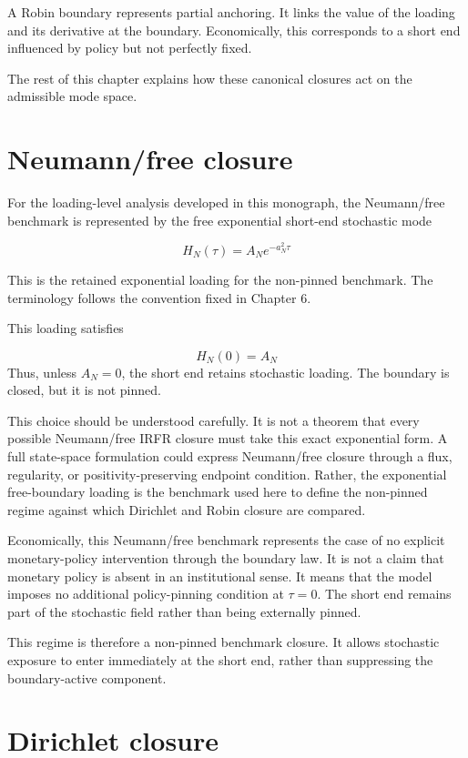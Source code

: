 \documentclass[11pt,oneside]{book}
\begin{document}
A Robin boundary represents partial anchoring. It links the value of the
loading and its derivative at the boundary. Economically, this
corresponds to a short end influenced by policy but not perfectly fixed.

The rest of this chapter explains how these canonical closures act on
the admissible mode space.

\section{Neumann/free closure}\label{naturalfree-closure}

For the loading-level analysis developed in this monograph, the Neumann/free
benchmark is represented by the free exponential short-end stochastic
mode

\[
H_N(\tau)=A_N e^{-a_N^2\tau}
\]

This is the retained exponential loading for the non-pinned benchmark. The terminology follows the convention fixed in Chapter 6.

This loading satisfies

\[
H_N(0) = A_N
\]
Thus, unless $A_N=0$, the short end retains stochastic loading. The
boundary is closed, but it is not pinned.

This choice should be understood carefully. It is not a theorem that
every possible Neumann/free IRFR closure must take this exact exponential
form. A full state-space formulation could express Neumann/free closure
through a flux, regularity, or positivity-preserving endpoint condition.
Rather, the exponential free-boundary loading is the benchmark used here
to define the non-pinned regime against which Dirichlet and Robin
closure are compared.

Economically, this Neumann/free benchmark represents the case of no
explicit monetary-policy intervention through the boundary law. It is
not a claim that monetary policy is absent in an institutional sense. It
means that the model imposes no additional policy-pinning condition at
$\tau=0$. The short end remains part of the stochastic field rather than
being externally pinned.

This regime is therefore a non-pinned benchmark closure. It allows
stochastic exposure to enter immediately at the short end, rather than
suppressing the boundary-active component.

\section{Dirichlet closure}\label{dirichlet-closure}
\end{document}
